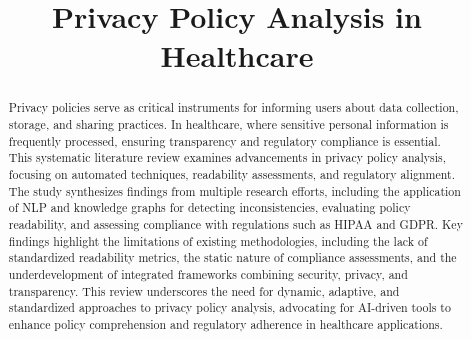 \documentclass[conference]{IEEEtran}
\begin{document}
\title{Privacy Policy Analysis in Healthcare\\}

\author{
\and
{}
\and
{}
}

\maketitle

\begin{abstract}

Privacy policies serve as critical instruments for informing users about data collection, storage, and sharing practices. In healthcare, where sensitive personal information is frequently processed, ensuring transparency and regulatory compliance is essential. This systematic literature review examines advancements in privacy policy analysis, focusing on automated techniques, readability assessments, and regulatory alignment. The study synthesizes findings from multiple research efforts, including the application of NLP and knowledge graphs for detecting inconsistencies, evaluating policy readability, and assessing compliance with regulations such as HIPAA and GDPR. Key findings highlight the limitations of existing methodologies, including the lack of standardized readability metrics, the static nature of compliance assessments, and the underdevelopment of integrated frameworks combining security, privacy, and transparency. This review underscores the need for dynamic, adaptive, and standardized approaches to privacy policy analysis, advocating for AI-driven tools to enhance policy comprehension and regulatory adherence in healthcare applications.

 

\end{abstract}
\end{document}

